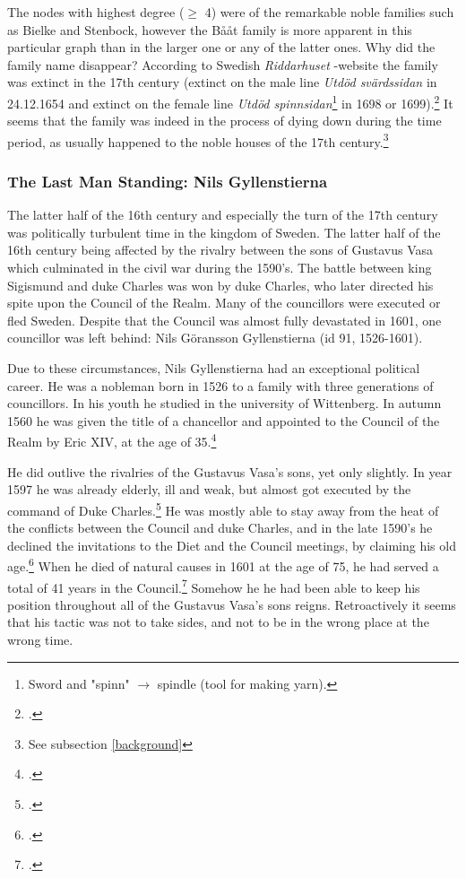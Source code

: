 The nodes with highest degree ($\geq$ 4) were of the remarkable noble families such as Bielke and Stenbock, however the Bååt family is more apparent in this particular graph than in the larger one or any of the latter ones. Why did the family name disappear? According to Swedish \textit{Riddarhuset} -website the family was extinct in the 17th century (extinct on the male line \textit{Utdöd svärdssidan} in 24.12.1654 and extinct on the female line \textit{Utdöd spinnsidan}\footnote{Sword and "spinn" $\rightarrow$ spindle (tool for making yarn).} in 1698 or 1699).\footcite{riddarhuset} It seems that the family was indeed in the process of dying down during the time period, as usually happened to the noble houses of the 17th century.\footnote{See subsection \ref{background}}

\subsubsection{The Last Man Standing: Nils Gyllenstierna}
The latter half of the 16th century and especially the turn of the 17th century was politically turbulent time in the kingdom of Sweden. The latter half of the 16th century being affected by the rivalry between the sons of Gustavus Vasa which culminated in the civil war during the 1590's. The battle between king Sigismund and duke Charles was won by duke Charles, who later directed his spite upon the Council of the Realm. Many of the councillors were executed or fled Sweden. Despite that the Council was almost fully devastated in 1601, one councillor was left behind: Nils Göransson Gyllenstierna (id 91, 1526-1601).

Due to these circumstances, Nils Gyllenstierna had an exceptional political career. He was a nobleman born in 1526 to a family with three generations of councillors. In his youth he studied in the university of Wittenberg. In autumn 1560 he was given the title of a chancellor and appointed to the Council of the Realm by Eric XIV, at the age of 35.\footcite{sbl_nils_gyllenstierna} 

He did outlive the rivalries of the Gustavus Vasa's sons, yet only slightly. In year 1597 he was already elderly, ill and weak, but almost got executed by the command of Duke Charles.\footcite[pp. 205-206.]{lappalainen09} He was mostly able to stay away from the heat of the conflicts between the Council and duke Charles, and in the late 1590's he declined the invitations to the Diet and the Council meetings, by claiming his old age.\footcite{sbl_nils_gyllenstierna} When he died of natural causes in 1601 at the age of 75, he had served a total of 41 years in the Council.\footcite{councillorsDS} Somehow he he had been able to keep his position throughout all of the Gustavus Vasa's sons reigns. Retroactively it seems that his tactic was not to take sides, and not to be in the wrong place at the wrong time.

